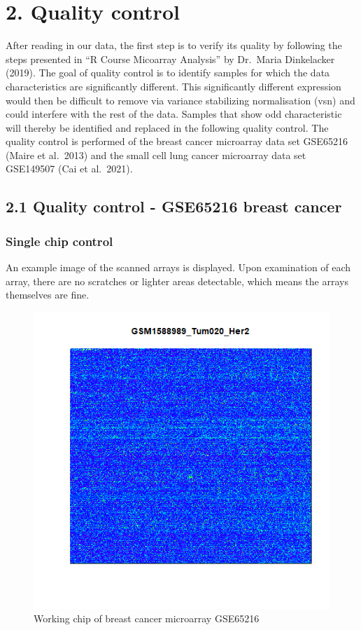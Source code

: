 \documentclass[
]{article}
\begin{document}
\hypertarget{quality-control}{%
\section{2. Quality control}\label{quality-control}}

After reading in our data, the first step is to verify its quality by
following the steps presented in ``R Course Micoarray Analysis'' by
Dr.~Maria Dinkelacker (2019). The goal of quality control is to identify
samples for which the data characteristics are significantly different.
This significantly different expression would then be difficult to
remove via variance stabilizing normalisation (vsn) and could interfere
with the rest of the data. Samples that show odd characteristic will
thereby be identified and replaced in the following quality control. The
quality control is performed of the breast cancer microarray data set
GSE65216 (Maire et al.~2013) and the small cell lung cancer microarray
data set GSE149507 (Cai et al.~2021).

\hypertarget{quality-control---gse65216-breast-cancer}{%
\subsection{2.1 Quality control - GSE65216 breast
cancer}\label{quality-control---gse65216-breast-cancer}}

\hypertarget{single-chip-control}{%
\subsubsection{Single chip control}\label{single-chip-control}}

An example image of the scanned arrays is displayed. Upon examination of
each array, there are no scratches or lighter areas detectable, which
means the arrays themselves are fine.

\begin{figure}

{\centering \includegraphics[width=0.5\linewidth]{images/breast_chip_control_example1} 

}

\caption{Working chip of breast cancer microarray GSE65216}\label{fig:unnamed-chunk-1}
\end{figure}
\end{document}
